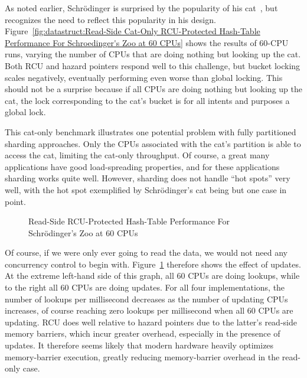 As noted earlier, Schr\"odinger is surprised by the popularity of his
cat~\cite{ErwinSchroedinger1935Cat}, but recognizes the need to reflect
this popularity in his design.
Figure~\ref{fig:datastruct:Read-Side Cat-Only RCU-Protected Hash-Table Performance For Schroedinger's Zoo at 60 CPUs}
shows the results of 60-CPU runs, varying the number of CPUs that are
doing nothing but looking up the cat.
Both RCU and hazard pointers respond well to this challenge, but
bucket locking scales negatively, eventually performing even worse
than global locking.
This should not be a surprise because if all CPUs are doing nothing
but looking up the cat, the lock corresponding to the cat's bucket
is for all intents and purposes a global lock.

This cat-only benchmark illustrates one potential problem with
fully partitioned sharding approaches.
Only the CPUs associated with the cat's
partition is able to access the cat, limiting the cat-only
throughput.
Of course, a great many applications have good load-spreading
properties, and for these applications sharding works
quite well.
However, sharding does not handle ``hot spots'' very well, with
the hot spot exemplified by Schr\"odinger's cat being but one case
in point.

\begin{figure}[tb]
\centering
{}
\caption{Read-Side RCU-Protected Hash-Table Performance For Schr\"odinger's Zoo at 60 CPUs}
\label{fig:datastruct:Read-Side RCU-Protected Hash-Table Performance For Schroedinger's Zoo at 60 CPUs}
\end{figure}

Of course, if we were only ever going to read the data, we would not need
any concurrency control to begin with.
Figure~\ref{fig:datastruct:Read-Side RCU-Protected Hash-Table Performance For Schroedinger's Zoo at 60 CPUs}
therefore shows the effect of updates.
At the extreme left-hand side of this graph, all 60 CPUs are doing lookups,
while to the right all 60 CPUs are doing updates.
For all four implementations, the number of lookups per millisecond
decreases as the number of updating CPUs increases, of course reaching
zero lookups per millisecond when all 60 CPUs are updating.
RCU does well relative to hazard pointers due to the latter's read-side
memory barriers, which incur greater overhead, especially in the presence
of updates.
It therefore seems likely that modern hardware heavily optimizes memory-barrier
execution, greatly reducing memory-barrier overhead in the read-only case.

